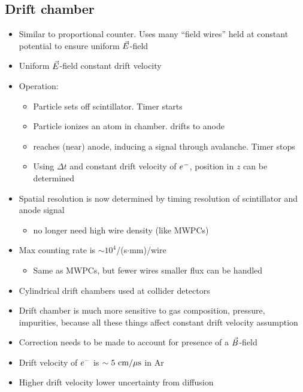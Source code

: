 \subsection{Drift chamber}
\begin{itemize}
  \item Similar to proportional counter. Uses many ``field wires'' held at constant potential to ensure uniform $\vec{E}$-field
  \item Uniform $\vec{E}$-field \thus constant drift velocity
  \item Operation:
  \begin{itemize}
    \item Particle sets off scintillator. Timer starts
    \item Particle ionizes an atom in chamber. \el drifts to anode
    \item \el reaches (near) anode, inducing a signal through avalanche. Timer stops
    \item Using $\Delta t$ and constant drift velocity of $e^{-}$, position in $z$ can be determined
  \end{itemize}
  \item Spatial resolution is now determined by timing resolution of scintillator and anode signal
  \begin{itemize}
    \item \thus no longer need high wire density (like MWPCs)
  \end{itemize}
  \item Max counting rate is $\sim 10^4$/(s$\cdot$mm)/wire
  \begin{itemize}
    \item Same as MWPCs, but fewer wires \thus smaller flux can be handled
  \end{itemize}
  \item Cylindrical drift chambers used at collider detectors
  \item Drift chamber is much more sensitive to gas composition, pressure, impurities, because all these things affect constant drift velocity assumption
  \item Correction needs to be made to account for presence of a $\vec{B}$-field
  \item Drift velocity of $e^{-}$ is $\sim 5~\text{cm}/\mu\text{s}$ in Ar
  \item Higher drift velocity \thus lower uncertainty from diffusion
\end{itemize}

